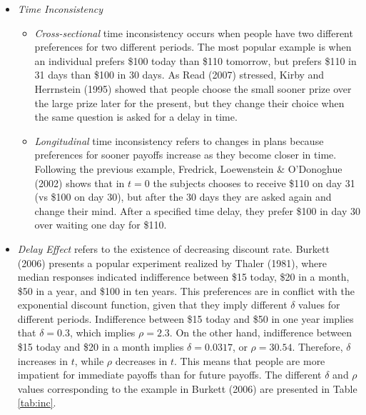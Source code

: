 \documentclass[]{article}
\providecommand{\tightlist}{%
  \setlength{\itemsep}{0pt}\setlength{\parskip}{0pt}}
\begin{document}
\begin{itemize}
\tightlist
\item
  \emph{Time Inconsistency}\\

  \begin{itemize}
  \tightlist
  \item
    \emph{Cross-sectional} time inconsistency occurs when people have two different preferences for two different periods. The most popular example is when an individual prefers \$100 today than \$110 tomorrow, but prefers \$110 in 31 days than \$100 in 30 days. As Read (2007) stressed, Kirby and Herrnstein (1995) showed that people choose the small sooner prize over the large prize later for the present, but they change their choice when the same question is asked for a delay in time.\\
  \item
    \emph{Longitudinal} time inconsistency refers to changes in plans because preferences for sooner payoffs increase as they become closer in time. Following the previous example, Fredrick, Loewenstein \& O'Donoghue (2002) shows that in \(t=0\) the subjects chooses to receive \$110 on day 31 (vs \$100 on day 30), but after the 30 days they are asked again and change their mind. After a specified time delay, they prefer \$100 in day 30 over waiting one day for \$110.\\
  \end{itemize}
\item
  \emph{Delay Effect} refers to the existence of decreasing discount rate. Burkett (2006) presents a popular experiment realized by Thaler (1981), where median responses indicated indifference between \$15 today, \$20 in a month, \$50 in a year, and \$100 in ten years. This preferences are in conflict with the exponential discount function, given that they imply different \(\delta\) values for different periods. Indifference between \$15 today and \$50 in one year implies that \(\delta=0.3\), which implies \(\rho=2.3\). On the other hand, indifference between \$15 today and \$20 in a month implies \(\delta=0.0317\), or \(\rho=30.54\). Therefore, \(\delta\) increases in \(t\), while \(\rho\) decreases in \(t\). This means that people are more impatient for immediate payoffs than for future payoffs. The different \(\delta\) and \(\rho\) values corresponding to the example in Burkett (2006) are presented in Table \ref{tab:inc}.\\
\end{itemize}
\end{document}
